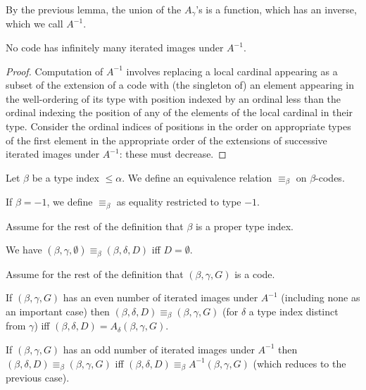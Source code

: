 \begin{definition}
\label {def:ainverse}
By the previous lemma, the union of the $A_\gamma$'s is a function, which has an inverse, which we call $A^{-1}$.
\end{definition}

\begin{lemma}
\label {lem:ainverse-stops}
No code has infinitely many iterated images under $A^{-1}$.
\end{lemma}

\begin{proof}
Computation of $A^{-1}$ involves replacing a local cardinal appearing as a subset of the extension of a code
with (the singleton of) an element appearing in the well-ordering of its type with position indexed by an ordinal
less than the ordinal indexing the position of any of the elements of the local cardinal in their type.  Consider the ordinal indices of positions in the order on appropriate types of the first element in the appropriate order of the extensions of successive iterated images under $A^{-1}$:  these must decrease.
\end{proof}

\begin{definition}
\label {def:equiv-code}
Let $\beta$ be a type index $\leq \alpha$.  We define an equivalence relation $\equiv_\beta$ on $\beta$-codes.

If $\beta=-1$, we define $\equiv_\beta$ as equality restricted to type $-1$.

Assume for the rest of the definition that $\beta$ is a proper type index.

We have $(\beta,\gamma,\emptyset) \equiv_\beta (\beta,\delta,D)$ iff $D=\emptyset$.

Assume for the rest of the definition that $(\beta,\gamma,G)$ is a code.

If $(\beta,\gamma,G)$ has an even number of iterated images under $A^{-1}$ (including none as an important case)
then $(\beta,\delta,D) \equiv_\beta (\beta,\gamma,G)$ (for $\delta$ a type index distinct from $\gamma$) iff
$(\beta,\delta,D) = A_{\delta}(\beta,\gamma,G)$.

If $(\beta,\gamma,G)$ has an odd number of iterated images under $A^{-1}$ then $(\beta,\delta,D) \equiv_\beta (\beta,\gamma,G)$ iff $(\beta,\delta,D) \equiv_\beta A^{-1}(\beta,\gamma,G)$ (which reduces to the previous case).
\end{definition}

